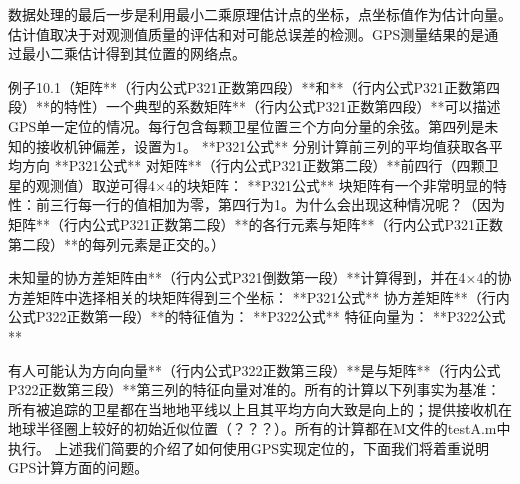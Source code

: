 数据处理的最后一步是利用最小二乘原理估计点的坐标，点坐标值作为估计向量。估计值取决于对观测值质量的评估和对可能总误差的检测。GPS测量结果的是通过最小二乘估计得到其位置的网络点。

例子10.1（矩阵**（行内公式P321正数第四段）**和**（行内公式P321正数第四段）**的特性）一个典型的系数矩阵**（行内公式P321正数第四段）**可以描述GPS单一定位的情况。每行包含每颗卫星位置三个方向分量的余弦。第四列是未知的接收机钟偏差，设置为1。
**P321公式**
分别计算前三列的平均值获取各平均方向
**P321公式**
对矩阵**（行内公式P321正数第二段）**前四行（四颗卫星的观测值）取逆可得4×4的块矩阵：
**P321公式**
块矩阵有一个非常明显的特性：前三行每一行的值相加为零，第四行为1。为什么会出现这种情况呢？（因为矩阵**（行内公式P321正数第二段）**的各行元素与矩阵**（行内公式P321正数第二段）**的每列元素是正交的。）

未知量的协方差矩阵由**（行内公式P321倒数第一段）**计算得到，并在4×4的协方差矩阵中选择相关的块矩阵得到三个坐标：
**P321公式**
协方差矩阵**（行内公式P322正数第一段）**的特征值为：
**P322公式**
特征向量为：
**P322公式**

有人可能认为方向向量**（行内公式P322正数第三段）**是与矩阵**（行内公式P322正数第三段）**第三列的特征向量对准的。所有的计算以下列事实为基准：所有被追踪的卫星都在当地地平线以上且其平均方向大致是向上的；提供接收机在地球半径圈上较好的初始近似位置（？？？）。所有的计算都在M文件的testA.m中执行。
上述我们简要的介绍了如何使用GPS实现定位的，下面我们将着重说明GPS计算方面的问题。
